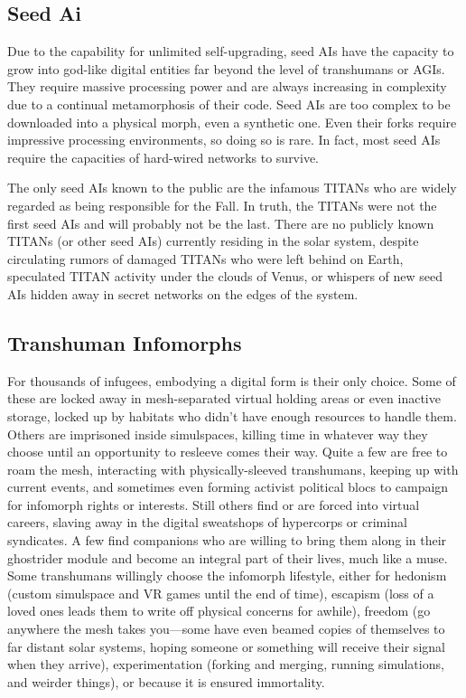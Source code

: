 \subsection{Seed Ai}

Due to the capability for unlimited self-upgrading, 
seed AIs have the capacity to grow into god-like 
digital entities far beyond the level of transhumans 
or AGIs. They require massive processing power and 
are always increasing in complexity due to a continual 
metamorphosis of their code. Seed AIs are too complex
to be downloaded into a physical morph, even
a synthetic one. Even their forks require impressive 
processing environments, so doing so is rare. In fact, 
most seed AIs require the capacities of hard-wired 
networks to survive.

The only seed AIs known to the public are the 
infamous TITANs who are widely regarded as being 
responsible for the Fall. In truth, the TITANs were 
not the first seed AIs and will probably not be the last. 
There are no publicly known TITANs (or other seed 
AIs) currently residing in the solar system, despite 
circulating rumors of damaged TITANs who were left 
behind on Earth, speculated TITAN activity under the 
clouds of Venus, or whispers of new seed AIs hidden 
away in secret networks on the edges of the system.

\subsection{Transhuman Infomorphs}

For thousands of infugees, embodying a digital form 
is their only choice. Some of these are locked away 
in mesh-separated virtual holding areas or even inactive
storage, locked up by habitats who didn't have
enough resources to handle them. Others are imprisoned
inside simulspaces, killing time in whatever way
they choose until an opportunity to resleeve comes 
their way. Quite a few are free to roam the mesh, interacting
with physically-sleeved transhumans, keeping
up with current events, and sometimes even forming
activist political blocs to campaign for infomorph
rights or interests. Still others find or are forced into 
virtual careers, slaving away in the digital sweatshops 
of hypercorps or criminal syndicates. A few find companions
who are willing to bring them along in their
ghostrider module and become an integral part of 
their lives, much like a muse.
Some transhumans willingly choose the infomorph 
lifestyle, either for hedonism (custom simulspace and 
VR games until the end of time), escapism (loss of a 
loved ones leads them to write off physical concerns 
for awhile), freedom (go anywhere the mesh takes 
you—some have even beamed copies of themselves to 
far distant solar systems, hoping someone or something 
will receive their signal when they arrive), experimentation
(forking and merging, running simulations, and
weirder things), or because it is ensured immortality.

